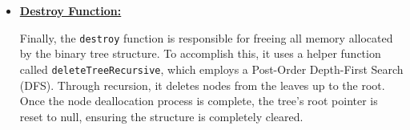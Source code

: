 \begin{itemize}
    \item \underline{\textbf{Destroy Function:}}

    Finally, the \texttt{destroy} function is responsible for freeing all memory allocated by the binary tree structure. To accomplish this, it uses a helper function called \texttt{deleteTreeRecursive}, which employs a Post-Order Depth-First Search (DFS). Through recursion, it deletes nodes from the leaves up to the root. Once the node deallocation process is complete, the tree's root pointer is reset to null, ensuring the structure is completely cleared.

\end{itemize}




